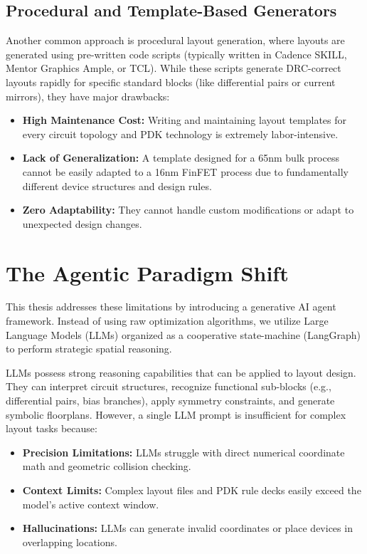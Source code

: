 \subsection{Procedural and Template-Based Generators}
Another common approach is procedural layout generation, where layouts are generated using pre-written code scripts (typically written in Cadence SKILL, Mentor Graphics Ample, or TCL). While these scripts generate DRC-correct layouts rapidly for specific standard blocks (like differential pairs or current mirrors), they have major drawbacks:
\begin{itemize}
    \item \textbf{High Maintenance Cost:} Writing and maintaining layout templates for every circuit topology and PDK technology is extremely labor-intensive.
    \item \textbf{Lack of Generalization:} A template designed for a 65nm bulk process cannot be easily adapted to a 16nm FinFET process due to fundamentally different device structures and design rules.
    \item \textbf{Zero Adaptability:} They cannot handle custom modifications or adapt to unexpected design changes.
\end{itemize}

\section{The Agentic Paradigm Shift}
\label{sec:agentic_paradigm}

This thesis addresses these limitations by introducing a generative AI agent framework. Instead of using raw optimization algorithms, we utilize Large Language Models (LLMs) organized as a cooperative state-machine (LangGraph) to perform strategic spatial reasoning.

LLMs possess strong reasoning capabilities that can be applied to layout design. They can interpret circuit structures, recognize functional sub-blocks (e.g., differential pairs, bias branches), apply symmetry constraints, and generate symbolic floorplans. However, a single LLM prompt is insufficient for complex layout tasks because:
\begin{itemize}
    \item \textbf{Precision Limitations:} LLMs struggle with direct numerical coordinate math and geometric collision checking.
    \item \textbf{Context Limits:} Complex layout files and PDK rule decks easily exceed the model's active context window.
    \item \textbf{Hallucinations:} LLMs can generate invalid coordinates or place devices in overlapping locations.
\end{itemize}

